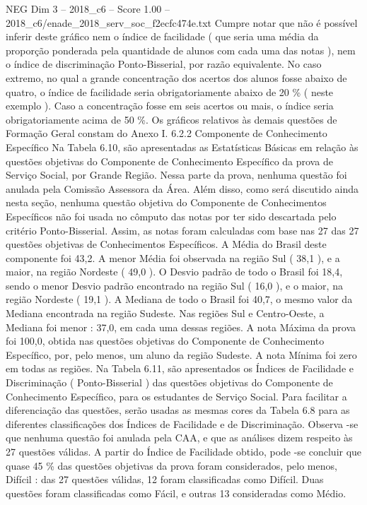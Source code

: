\begin{textsample}{NEG Dim 3 – 2018\_c6 – Score 1.00 – 2018\_c6/enade\_2018\_serv\_soc\_f2ecfc474e.txt}
Cumpre notar que não é possível inferir deste gráfico nem o índice de facilidade ( que seria uma média da proporção ponderada pela quantidade de alunos com cada uma das notas ), nem o índice de discriminação Ponto-Bisserial, por razão equivalente.
No caso extremo, no qual a grande concentração dos acertos dos alunos fosse abaixo de quatro, o índice de facilidade seria obrigatoriamente abaixo de 20 \% ( neste exemplo ).
Caso a concentração fosse em seis acertos ou mais, o índice seria obrigatoriamente acima de 50 \%.
Os gráficos relativos às demais questões de Formação Geral constam do Anexo I. 6.2.2 Componente de Conhecimento Específico Na Tabela 6.10, são apresentadas as Estatísticas Básicas em relação às questões objetivas do Componente de Conhecimento Específico da prova de Serviço Social, por Grande Região.
Nessa parte da prova, nenhuma questão foi anulada pela Comissão Assessora da Área.
Além disso, como será discutido ainda nesta seção, nenhuma questão objetiva do Componente de Conhecimentos Específicos não foi usada no cômputo das notas por ter sido descartada pelo critério Ponto-Bisserial.
Assim, as notas foram calculadas com base nas 27 das 27 questões objetivas de Conhecimentos Específicos.
A Média do Brasil deste componente foi 43,2.
A menor Média foi observada na região Sul ( 38,1 ), e a maior, na região Nordeste ( 49,0 ).
O Desvio padrão de todo o Brasil foi 18,4, sendo o menor Desvio padrão encontrado na região Sul ( 16,0 ), e o maior, na região Nordeste ( 19,1 ).
A Mediana de todo o Brasil foi 40,7, o mesmo valor da Mediana encontrada na região Sudeste.
Nas regiões Sul e Centro-Oeste, a Mediana foi menor : 37,0, em cada uma dessas regiões.
A nota Máxima da prova foi 100,0, obtida nas questões objetivas do Componente de Conhecimento Específico, por, pelo menos, um aluno da região Sudeste.
A nota Mínima foi zero em todas as regiões.
Na Tabela 6.11, são apresentados os Índices de Facilidade e Discriminação ( Ponto-Bisserial ) das questões objetivas do Componente de Conhecimento Específico, para os estudantes de Serviço Social.
Para facilitar a diferenciação das questões, serão usadas as mesmas cores da Tabela 6.8 para as diferentes classificações dos Índices de Facilidade e de Discriminação.
Observa -se que nenhuma questão foi anulada pela CAA, e que as análises dizem respeito às 27 questões válidas.
A partir do Índice de Facilidade obtido, pode -se concluir que quase 45 \% das questões objetivas da prova foram considerados, pelo menos, Difícil : das 27 questões válidas, 12 foram classificadas como Difícil.
Duas questões foram classificadas como Fácil, e outras 13 consideradas como Médio.

\end{textsample}
